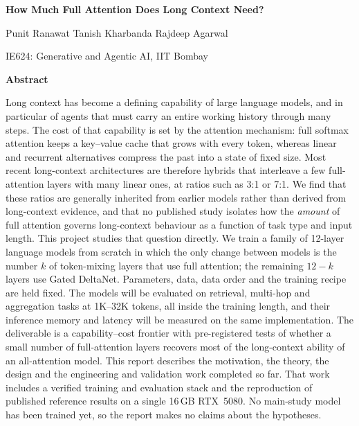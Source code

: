 \documentclass[10pt,a4paper]{article}
\begin{document}
\begin{center}
{\fontsize{16}{20}\selectfont\bfseries How Much Full Attention Does Long Context Need?\par}
\vspace{0.35cm}
{\normalsize Punit Ranawat \quad Tanish Kharbanda \quad Rajdeep Agarwal\par}
\vspace{0.05cm}
{\small IE624: Generative and Agentic AI, IIT Bombay\par}
\end{center}
\vspace{0.3cm}
\begin{center}{\large\bfseries Abstract}\end{center}
\vspace{-0.15cm}
\begin{list}{}{\setlength{\leftmargin}{0.5in}\setlength{\rightmargin}{0.5in}}\item[]
Long context has become a defining capability of large language models, and in particular of agents
that must carry an entire working history through many steps. The cost of that capability is set by
the attention mechanism: full softmax attention keeps a key--value cache that grows with every token,
whereas linear and recurrent alternatives compress the past into a state of fixed size.
Most recent long-context architectures are therefore hybrids that interleave a few full-attention
layers with many linear ones, at ratios such as 3:1 or 7:1. We find that these ratios are generally
inherited from earlier models rather than derived from long-context evidence, and that no published
study isolates how the \emph{amount} of full attention governs long-context behaviour as a function of
task type and input length. This project studies that question directly. We train a family of
12-layer language models from scratch in which the only change between models is the number $k$ of
token-mixing layers that use full attention; the remaining $12-k$ layers use Gated DeltaNet.
Parameters, data, data order and the training recipe are held fixed. The models will be evaluated
on retrieval, multi-hop and aggregation tasks at 1K--32K tokens, all inside the training length,
and their inference memory and latency will be measured on the same implementation. The deliverable
is a capability--cost frontier with pre-registered tests of whether a small number of full-attention
layers recovers most of the long-context ability of an all-attention model. This report describes the
motivation, the theory, the design and the engineering and validation work completed so far. That
work includes a verified training and evaluation stack and the reproduction of published reference
results on a single 16\,GB RTX~5080. No main-study model has been trained yet, so the report makes
no claims about the hypotheses.
\end{list}
\vspace{0.3cm}
\end{document}

